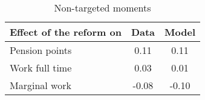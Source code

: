 \begin{table}[htbp]\caption{Non-targeted moments}\label{table:nontargeted_moments}\centering\footnotesize\begin{tabular}{lcc} \toprule  Effect of the reform on &   Data & Model  \\\midrule    Pension points   & 0.11 &0.11\\ Work full time    & 0.03 &0.01\\ Marginal work    & -0.08 &-0.10\\  \bottomrule\end{tabular}\end{table}